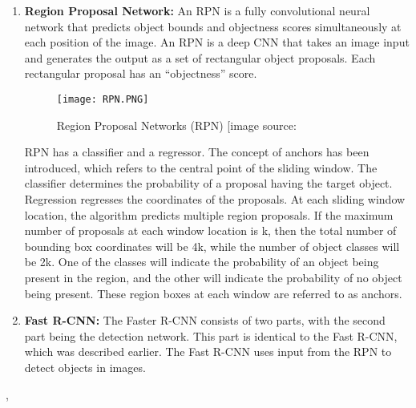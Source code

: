 \begin{enumerate}
    \item \textbf{Region Proposal Network: } An RPN is a fully convolutional neural network that predicts object bounds and objectness scores simultaneously at each position of the image.
    An RPN is a deep CNN that takes an image input and generates the output as a set of rectangular object proposals. Each rectangular proposal has an “objectness” score.
    
    \begin{figure}[H]
        \centering
        \texttt{[image: RPN.PNG]}
        \caption{Region Proposal Networks (RPN) [image source: \cite{chen2018enhanced}}
        \label{fig:RPN}
    \end{figure}
    RPN has a classifier and a regressor. The concept of anchors has been introduced, which refers to the central point of the sliding window.
    The classifier determines the probability of a proposal having the target object. Regression
    regresses the coordinates of the proposals.
    At each sliding window location, the algorithm predicts multiple region proposals. If the maximum number of proposals at each window location is k, then the total number of bounding box coordinates will be 4k, while the number of object classes will be 2k. One of the classes will indicate the probability of an object being present in the region, and the other will indicate the probability of no object being present. These region boxes at each window are referred to as anchors.\\
    \item \textbf{Fast R-CNN: } The Faster R-CNN consists of two parts, with the second part being the detection network. This part is identical to the Fast R-CNN, which was described earlier. The Fast R-CNN uses input from the RPN to detect objects in images.
\end{enumerate} \cite{ansari2020building}, \cite{salvador2016faster}



